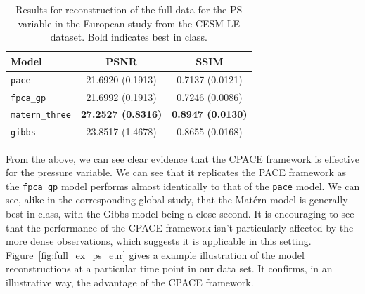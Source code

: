 \begin{table}
	\caption[Results for the PS variable on full data in the European study.]{Results for reconstruction of the full data for the PS variable in the European study from the CESM-LE dataset. Bold indicates best in class.}
	\centering
	\label{tab:full_cesm_ps_eur}
	\begin{tabular}{lcc}
		\toprule
		\textbf{Model} & \textbf{PSNR} & \textbf{SSIM} \\
		\midrule
		\verb*|pace| & 21.6920 (0.1913) & 0.7137 (0.0121) \\
		\verb*|fpca_gp| & 21.6992 (0.1913)& 0.7246	(0.0086) \\
		\verb*|matern_three| & \textbf{27.2527	(0.8316)}& \textbf{0.8947 (0.0130)}\\
		\verb*|gibbs| & 23.8517	(1.4678) & 0.8655 (0.0168)\\
		\bottomrule
	\end{tabular}
\end{table}

From the above, we can see clear evidence that the CPACE framework is effective for the pressure variable.
We can see that it replicates the PACE framework as the \verb*|fpca_gp| model performs almost identically to that of the \verb*|pace| model.
We can see, alike in the corresponding global study, that the Mat\'ern model is generally best in class, with the Gibbs model being a close second.
It is encouraging to see that the performance of the CPACE framework isn't particularly affected by the more dense observations, which suggests it is applicable in this setting. 
Figure~\ref{fig:full_ex_ps_eur} gives a example illustration of the model reconstructions at a particular time point in our data set.
It confirms,  in an illustrative way, the advantage of the CPACE framework.

